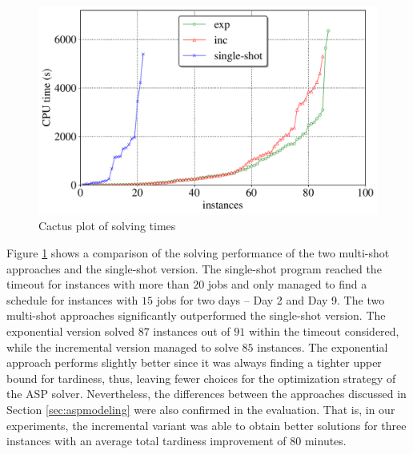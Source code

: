 \documentclass[submission,copyright,creativecommons]{eptcs}
\begin{document}
\begin{figure}[b]
	\centering
	
	\includegraphics[width=0.75\linewidth]{figures/cactus_time_font20.pdf}
	\caption{Cactus plot of solving times \label{fig:cactus:time}}
	  
\end{figure}

Figure \ref{fig:cactus:time} shows a comparison of the solving performance of the two multi-shot approaches and the single-shot version. The single-shot program reached the timeout for instances with more than $20$ jobs and only managed to find a schedule for instances with $15$ jobs for two days -- Day 2 and Day 9.
%
The two multi-shot approaches significantly outperformed the single-shot version. The exponential version solved $87$ instances out of $91$ within the timeout considered, while the incremental version managed to solve $85$ instances. The exponential approach performs slightly better since it was always finding a tighter upper bound for tardiness, thus, leaving fewer choices for the optimization strategy of the ASP solver. Nevertheless, the differences between the approaches discussed in Section \ref{sec:aspmodeling} were also confirmed in the evaluation. That is, in our experiments, the incremental variant was able to obtain better solutions for three instances with an average total tardiness improvement of 80 minutes.

\nocite{*}


\end{document}
